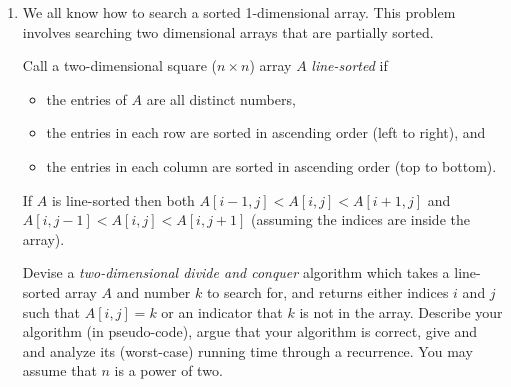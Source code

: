 \documentclass[11pt]{article}
\theoremstyle{definition}
\newtheorem*{solution}{Solution}
\begin{document}
\begin{enumerate}
\begin{enumerate}
\begin{solution}
    than each other. These comaprisons are made in constant time so our recurrance relation is $T(n) = T(\frac{n}{2}) + \mathcal{O}(1)$. Using Master's Theorem, we can say that:
    \begin{center}
        $a$ = 1, $b$ = 2, $d$ = 0
    \end{center}  
    Using case \#2, I get $f(n) = \mathcal{O}(n^{\log_ba})$. We can then say that $T(n) = \mathcal{O}(n^{\log_ba}\log n)$. Plugging in the above values, I get:
    \begin{align*}
        T(n) & = \mathcal{O}(n^{\log_21}\log n) \\[0.7em]
        & = \mathcal{O}(n^{0}\log n) \\[0.7em]
        & = \mathcal{O}(\log n)
    \end{align*}
    Therefore, we can conclude, through the Master's Theorem, that the worst case runtime of my algorithm is $\mathcal{O}(\log n)$.
\end{solution}
\newpage
\end{enumerate}

\emph{I have read and agree to the collaboration policy.}  -- Isai Lopez Rodas, ilopezro@ucsc.edu
\\
Collaborators: None%
\\
\hrule
\item 
We all know how to search a sorted 1-dimensional array. 
This problem involves searching two dimensional arrays that are partially sorted.

Call a two-dimensional square ($n\times n$) array $A$ \emph{line-sorted} if 
\begin{itemize}
\item the entries of $A$ are all distinct numbers,
\item the entries in each row are sorted in ascending order (left to right), and 
\item the entries in each column are sorted in ascending order (top to bottom).
\end{itemize}

If $A$ is line-sorted then both
$A[i-1,j] < A[i,j] < A[i+1, j]$ and 
$A[i,j-1] < A[i,j] < A[i, j+1]$ (assuming the indices are inside the array).

Devise a \emph{two-dimensional divide and conquer} algorithm which takes a line-sorted array $A$ and 
number $k$ to search for, 
and returns either indices $i$ and $j$ such that $A[i,j] = k$  or an indicator that $k$ is not in the array.
Describe your algorithm (in pseudo-code),  
argue that your algorithm is correct, give and
and analyze its (worst-case) running time through a recurrence. 
You may assume that $n$ is a power of two.


\end{enumerate}
\end{document}
